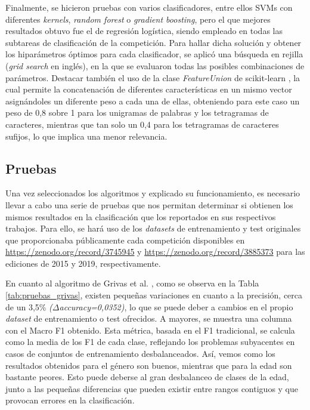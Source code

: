 {Finalmente, se hicieron pruebas con varios clasificadores, entre ellos SVMs con diferentes \textit{kernels}, \textit{random forest} o \textit{gradient boosting}, pero el que mejores resultados
obtuvo fue el de regresión logística, siendo empleado en todas las subtareas de clasificación de la competición. Para hallar dicha solución y obtener los hiparámetros óptimos para cada
clasificador, se aplicó una búsqueda en rejilla (\textit{grid search} en inglés), en la que se evaluaron todas las posibles combinaciones de parámetros.
Destacar también el uso de la clase \textit{FeatureUnion} de scikit-learn \cite{scikitlearn}, la cual permite la concatenación de diferentes características en un mismo vector asignándoles
un diferente peso a cada una de ellas, obteniendo para este caso un peso de 0,8 sobre 1 para los unigramas de palabras y los tetragramas de caracteres, mientras que tan solo un 0,4 para los tetragramas de caracteres sufijos,
lo que implica una menor relevancia.

\subsection{Pruebas}

Una vez seleccionados los algoritmos y explicado su funcionamiento, es necesario llevar a cabo una serie de pruebas que nos permitan determinar
si obtienen los mismos resultados en la clasificación que los reportados en sus respectivos trabajos.
Para ello, se hará uso de los \textit{datasets} de entrenamiento y test originales que proporcionaba públicamente cada competición disponibles
en \url{https://zenodo.org/record/3745945} y \url{https://zenodo.org/record/3885373} para las ediciones de 2015 y 2019, respectivamente.

\bigskip
En cuanto al algoritmo de Grivas et al. \cite{grivas2015author}, como se observa en la Tabla \ref{tab:pruebas_grivas}, existen pequeñas variaciones en
cuanto a la precisión, cerca de un 3,5\% 	\textit{($\Delta$accuracy=0,0352)}, lo que se puede deber a cambios en el propio \textit{dataset} de entrenamiento o test ofrecidos. A mayores,
se muestra una columna con el Macro F1 obtenido. Esta métrica, basada en el F1 tradicional, se calcula como la media de los F1 de cada clase,
reflejando los problemas subyacentes en casos de conjuntos de entrenamiento desbalanceados.
Así, vemos como los resultados obtenidos para el género son buenos, mientras que para la edad son bastante peores. Esto puede deberse al gran
desbalanceo de clases de la edad, junto a las pequeñas diferencias que pueden existir entre rangos contiguos y que provocan errores en la clasificación.

}
